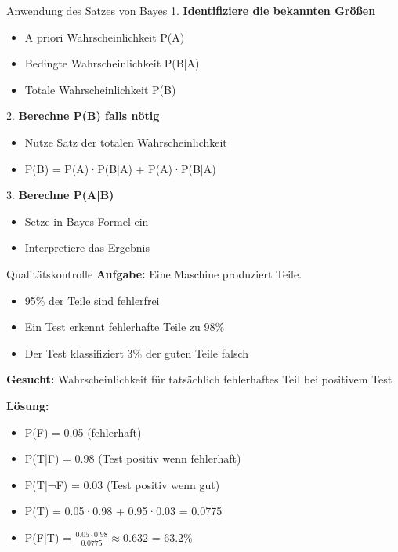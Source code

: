 \begin{KR}{Anwendung des Satzes von Bayes}
1. \textbf{Identifiziere die bekannten Größen}
   \begin{itemize}
   \item A priori Wahrscheinlichkeit P(A)
   \item Bedingte Wahrscheinlichkeit P(B|A)
   \item Totale Wahrscheinlichkeit P(B)
   \end{itemize}

2. \textbf{Berechne P(B) falls nötig}
   \begin{itemize}
   \item Nutze Satz der totalen Wahrscheinlichkeit
   \item P(B) = P(A)·P(B|A) + P(Ā)·P(B|Ā)
   \end{itemize}

3. \textbf{Berechne P(A|B)}
   \begin{itemize}
   \item Setze in Bayes-Formel ein
   \item Interpretiere das Ergebnis
   \end{itemize}
\end{KR}

\begin{example2}{Qualitätskontrolle}
\textbf{Aufgabe:} Eine Maschine produziert Teile. 
\begin{itemize}
\item 95\% der Teile sind fehlerfrei
\item Ein Test erkennt fehlerhafte Teile zu 98\%
\item Der Test klassifiziert 3\% der guten Teile falsch
\end{itemize}

\textbf{Gesucht:} Wahrscheinlichkeit für tatsächlich fehlerhaftes Teil bei positivem Test

\textbf{Lösung:}
\begin{itemize}
\item P(F) = 0.05 (fehlerhaft)
\item P(T|F) = 0.98 (Test positiv wenn fehlerhaft)
\item P(T|¬F) = 0.03 (Test positiv wenn gut)
\item P(T) = 0.05·0.98 + 0.95·0.03 = 0.0775
\item P(F|T) = $\frac{0.05 \cdot 0.98}{0.0775} \approx 0.632$ = 63.2\%
\end{itemize}
\end{example2}

